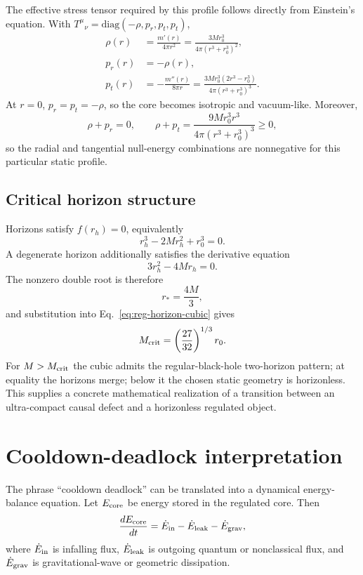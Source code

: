 \documentclass[11pt]{article}
\theoremstyle{remark}
\begin{document}
The effective stress tensor required by this profile follows directly from Einstein's equation. With $T^\mu{}_{\nu}=\mathrm{diag}(-\rho,p_r,p_t,p_t)$,
\begin{align}
 \rho(r)&=\frac{m'(r)}{4\pi r^2}
 =\frac{3Mr_0^3}{4\pi(r^3+r_0^3)^2},\\
 p_r(r)&=-\rho(r),\\
 p_t(r)&=-\frac{m''(r)}{8\pi r}
 =\frac{3Mr_0^3(2r^3-r_0^3)}{4\pi(r^3+r_0^3)^3}.
 \label{eq:reg-explicit-stress}
\end{align}
At $r=0$, $p_r=p_t=-\rho$, so the core becomes isotropic and vacuum-like. Moreover,
\begin{equation}
 \rho+p_r=0,
 \qquad
 \rho+p_t
 =\frac{9Mr_0^3r^3}{4\pi(r^3+r_0^3)^3}\ge0,
 \label{eq:reg-nec}
\end{equation}
so the radial and tangential null-energy combinations are nonnegative for this particular static profile.

\subsection{Critical horizon structure}
Horizons satisfy $f(r_h)=0$, equivalently
\begin{equation}
 r_h^3-2Mr_h^2+r_0^3=0.
 \label{eq:reg-horizon-cubic}
\end{equation}
A degenerate horizon additionally satisfies the derivative equation
\begin{equation}
 3r_h^2-4Mr_h=0.
\end{equation}
The nonzero double root is therefore
\begin{equation}
 r_*=\frac{4M}{3},
\end{equation}
and substitution into Eq.~\eqref{eq:reg-horizon-cubic} gives
\begin{equation}
 M_{\rm crit}=\left(\frac{27}{32}\right)^{1/3}r_0.
 \label{eq:reg-critical-mass}
\end{equation}
For $M>M_{\rm crit}$ the cubic admits the regular-black-hole two-horizon pattern; at equality the horizons merge; below it the chosen static geometry is horizonless. This supplies a concrete mathematical realization of a transition between an ultra-compact causal defect and a horizonless regulated object.


\section{Cooldown-deadlock interpretation}
The phrase ``cooldown deadlock'' can be translated into a dynamical energy-balance equation. Let $E_{\rm core}$ be energy stored in the regulated core. Then
\begin{equation}
    \frac{dE_{\rm core}}{dt}
    = \dot E_{\rm in}-\dot E_{\rm leak}-\dot E_{\rm grav},
\end{equation}
where $\dot E_{\rm in}$ is infalling flux, $\dot E_{\rm leak}$ is outgoing quantum or nonclassical flux, and $\dot E_{\rm grav}$ is gravitational-wave or geometric dissipation.
\end{document}
